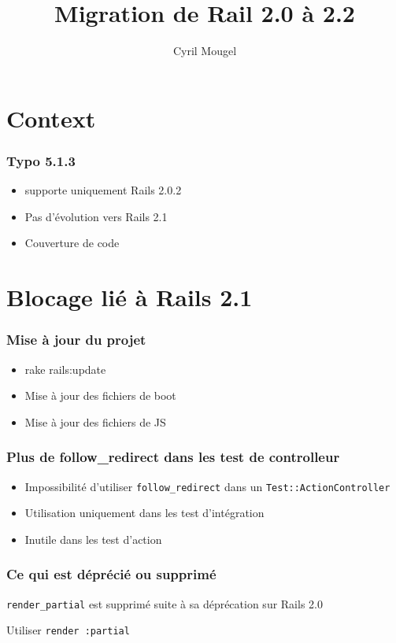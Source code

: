 \documentclass{beamer}
\title{Migration de Rail 2.0 à 2.2}
\author{Cyril Mougel}
\begin{document}
\begin{frame}
    \titlepage
\end{frame}

\section{Context}

\begin{frame}
	\frametitle{Typo 5.1.3}
	\begin{itemize}
		\item supporte uniquement Rails 2.0.2
		\item Pas d'évolution vers Rails 2.1
		\item Couverture de code
	\end{itemize}
\end{frame}

\section{Blocage lié à Rails 2.1}

\begin{frame}
    \frametitle{Mise à jour du projet}
    \begin{itemize}
        \item rake rails:update
        \item Mise à jour des fichiers de boot
        \item Mise à jour des fichiers de JS
    \end{itemize}
\end{frame}

\begin{frame}
    \frametitle{Plus de follow\_redirect dans les test de controlleur}
    \begin{itemize}
        \item Impossibilité d'utiliser \lstinline!follow_redirect! dans un
        \lstinline!Test::ActionController!
        \item Utilisation uniquement dans les test d'intégration
        \item Inutile dans les test d'action
    \end{itemize}
\end{frame}

\begin{frame}
    \frametitle{Ce qui est déprécié ou supprimé}
    \lstinline!render_partial! est supprimé suite à sa déprécation sur Rails
        2.0
        
    Utiliser \lstinline!render :partial!
\end{frame}
\end{document}
